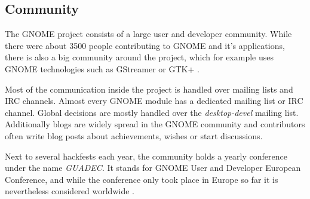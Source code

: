 
\subsection{Community} %

The GNOME project consists of a large user and developer community. While there
were about 3500 people contributing to GNOME and it's applications, there is
also a big community around the project, which for example uses GNOME
technologies such as GStreamer or GTK+ \cite{GNOMEAbout,GNOMETeams}.

Most of the communication inside the project is handled over mailing lists and
\ac{IRC} channels. Almost every GNOME module has a dedicated mailing list or
\ac{IRC} channel. Global decisions are mostly handled over the
\emph{desktop-devel} mailing list. Additionally blogs are widely spread in the
GNOME community and contributors often write blog posts about achievements,
wishes or start discussions.

Next to several hackfests each year, the community holds a yearly conference
under the name \emph{GUADEC}. It stands for GNOME User and Developer European
Conference, and while the conference only took place in Europe so far it is
nevertheless considered worldwide \cite{GNOMEGUADEC}.

